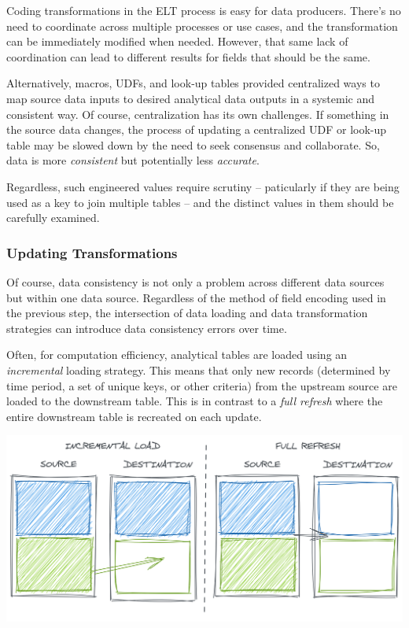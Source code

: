 \documentclass[
]{krantz}
\begin{document}
Coding transformations in the ELT process is easy for data producers. There's no need to coordinate across multiple processes or use cases, and the transformation can be immediately modified when needed. However, that same lack of coordination can lead to different results for fields that should be the same.

Alternatively, macros, UDFs, and look-up tables provided centralized ways to map source data inputs to desired analytical data outputs in a systemic and consistent way. Of course, centralization has its own challenges. If something in the source data changes, the process of updating a centralized UDF or look-up table may be slowed down by the need to seek consensus and collaborate. So, data is more \emph{consistent} but potentially less \emph{accurate}.

Regardless, such engineered values require scrutiny -- paticularly if they are being used as a key to join multiple tables -- and the distinct values in them should be carefully examined.

\hypertarget{updating-transformations}{%
\subsubsection{Updating Transformations}\label{updating-transformations}}

Of course, data consistency is not only a problem across different data sources but within one data source. Regardless of the method of field encoding used in the previous step, the intersection of data loading and data transformation strategies can introduce data consistency errors over time.

Often, for computation efficiency, analytical tables are loaded using an \emph{incremental} loading strategy. This means that only new records (determined by time period, a set of unique keys, or other criteria) from the upstream source are loaded to the downstream table. This is in contrast to a \emph{full refresh} where the entire downstream table is recreated on each update.

\begin{center}\includegraphics[width=0.9\linewidth]{figures/data-dall/incr-full-good} \end{center}
\end{document}
